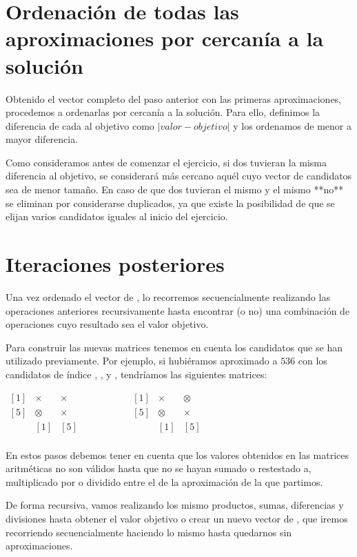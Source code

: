 \pagebreak

\section{Ordenación de todas las aproximaciones por cercanía a la solución}

Obtenido el vector completo del paso anterior con las primeras aproximaciones, procedemos a ordenarlas por cercanía a la solución.
Para ello, definimos la diferencia de cada  al objetivo como $|valor-objetivo|$ y los ordenamos de menor a mayor diferencia.

Como consideramos antes de comenzar el ejercicio, si dos  tuvieran la misma diferencia al objetivo, se considerará más cercano aquél cuyo vector de candidatos sea de menor tamaño.
En caso de que dos  tuvieran el mismo  y el mismo  **no** se eliminan por considerarse duplicados, ya que existe la posibilidad de que se elijan varios candidatos iguales al inicio del ejercicio.

\section{Iteraciones posteriores}

Una vez ordenado el vector de , lo recorremos secuencialmente realizando las operaciones anteriores recursivamente hasta encontrar (o no) una combinación de operaciones cuyo resultado sea el valor objetivo.

Para construir las nuevas matrices tenemos en cuenta los candidatos que se han utilizado previamente.
Por ejemplo, si hubiéramos aproximado a $536$ con los candidatos de índice , ,  y , tendríamos las siguientes matrices:

\begin{center}
$\begin{matrix}
[1] & \times  & \times \\
[5] & \otimes & \times \\
    &   [1]   &   [5]  \\
\end{matrix}
\ \ \ \ \ \ \ \ \ \ \ \ \ \ \ \ \ \ \ \ \ \ \begin{matrix}
[1] & \times  & \otimes \\
[5] & \otimes & \times  \\
    &   [1]   &    [5]  \\
\end{matrix}$
\end{center}

En estos pasos debemos tener en cuenta que los valores obtenidos en las matrices aritméticas no son válidos hasta que no se hayan sumado o restestado a, multiplicado por o dividido entre el  de la aproximación de la que partimos.

De forma recursiva, vamos realizando los mismo productos, sumas, diferencias y divisiones hasta obtener el valor objetivo o crear un nuevo vector de , que iremos recorriendo secuencialmente haciendo lo mismo hasta quedarnos sin aproximaciones.

